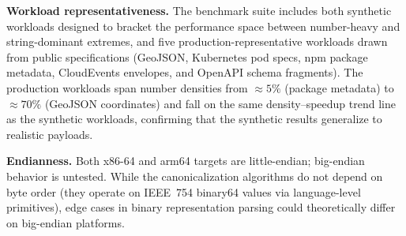 \textbf{Workload representativeness.}
The benchmark suite includes both synthetic workloads designed to bracket
the performance space between number-heavy and string-dominant extremes,
and five production-representative workloads drawn from public
specifications (GeoJSON, Kubernetes pod specs, npm package metadata,
CloudEvents envelopes, and OpenAPI schema fragments).  The production
workloads span number densities from ${\approx}5\%$ (package metadata)
to ${\approx}70\%$ (GeoJSON coordinates) and fall on the same
density--speedup trend line as the synthetic workloads, confirming that
the synthetic results generalize to realistic payloads.

\textbf{Endianness.}
Both x86-64 and arm64 targets are little-endian; big-endian behavior is
untested.  While the canonicalization algorithms do not depend on byte
order (they operate on IEEE~754 binary64 values via language-level
primitives), edge cases in binary representation parsing could
theoretically differ on big-endian platforms.
